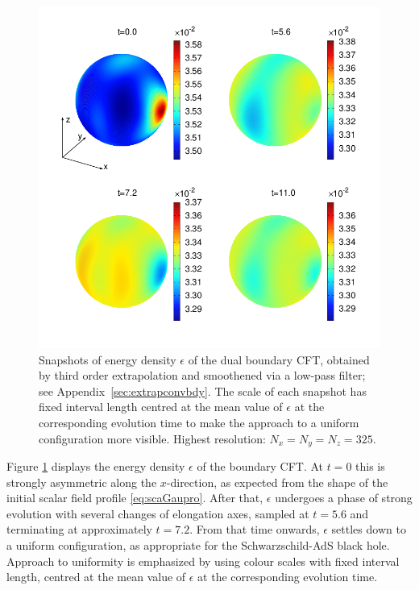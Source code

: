 \documentclass[a4paper,11pt]{article}
\numberwithin{equation}{section}
\begin{document}
\begin{figure}[!h]
        \centering
        \includegraphics[width=5.0in,clip=true]{plots/bdyplots/L3/bdyenergydensity/sphereplots_bdyenergydensity_L3_2by2.png}
\parbox{5.0in}{\caption{Snapshots of energy density $\epsilon$ of the dual boundary CFT, obtained by third order extrapolation and smoothened via a low-pass filter;
see Appendix~\ref{sec:extrapconvbdy}. The scale of each snapshot has fixed interval length centred at the mean value of $\epsilon$ at the corresponding evolution time to make the approach to a uniform configuration more visible. Highest resolution: $N_x=N_y=N_z=325$.
        }\label{fig:snapshotsenergydensity}}
\end{figure}

Figure \ref{fig:snapshotsenergydensity} displays the energy density $\epsilon$ of the boundary CFT.
At $t=0$ this is strongly asymmetric along the $x$-direction, as expected from the shape of the initial scalar field profile \eqref{eq:scaGaupro}. 
After that, $\epsilon$ undergoes a phase of strong evolution with several changes of elongation axes, sampled at $t=5.6$ and terminating at approximately $t=7.2$. From that time onwards, $\epsilon$ settles down to a uniform configuration, as appropriate for the Schwarzschild-AdS black hole. Approach to uniformity is emphasized by using colour scales with fixed interval length, centred at the mean value of $\epsilon$ at the corresponding evolution time.
\end{document}
